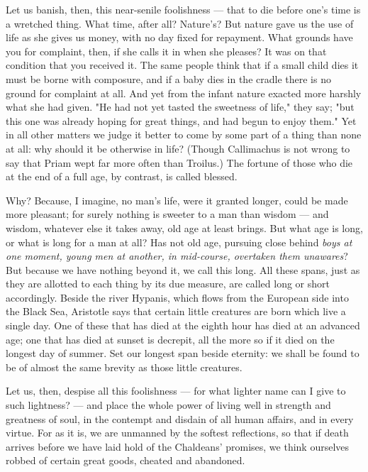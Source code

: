  Let us banish, then, this near-senile foolishness — that to die before one's time is a wretched thing. What time, after all? Nature's? But nature gave us the use of life as she gives us money, with no day fixed for repayment. What grounds have you for complaint, then, if she calls it in when she pleases? It was on that condition that you received it. The same people think that if a small child dies it must be borne with composure, and if a baby dies in the cradle there is no ground for complaint at all. And yet from the infant nature exacted more harshly what she had given. "He had not yet tasted the sweetness of life," they say; "but this one was already hoping for great things, and had begun to enjoy them." Yet in all other matters we judge it better to come by some part of a thing than none at all: why should it be otherwise in life? (Though Callimachus is not wrong to say that Priam wept far more often than Troilus.) The fortune of those who die at the end of a full age, by contrast, is called blessed.

 Why? Because, I imagine, no man's life, were it granted longer, could be made more pleasant; for surely nothing is sweeter to a man than wisdom — and wisdom, whatever else it takes away, old age at least brings. But what age is long, or what is long for a man at all? Has not old age, pursuing close behind \textit{boys at one moment, young men at another, in mid-course, overtaken them unawares}? But because we have nothing beyond it, we call this long. All these spans, just as they are allotted to each thing by its due measure, are called long or short accordingly. Beside the river Hypanis, which flows from the European side into the Black Sea, Aristotle says that certain little creatures are born which live a single day. One of these that has died at the eighth hour has died at an advanced age; one that has died at sunset is decrepit, all the more so if it died on the longest day of summer. Set our longest span beside eternity: we shall be found to be of almost the same brevity as those little creatures.

 Let us, then, despise all this foolishness — for what lighter name can I give to such lightness? — and place the whole power of living well in strength and greatness of soul, in the contempt and disdain of all human affairs, and in every virtue. For as it is, we are unmanned by the softest reflections, so that if death arrives before we have laid hold of the Chaldeans' promises, we think ourselves robbed of certain great goods, cheated and abandoned.

